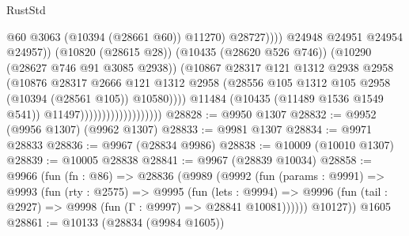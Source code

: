 \begin{lexlean}{RustStd}
\begin{coremodule}
                                                          @60
                                                          @3063
                                                          (@10394 (@28661 @60))
                                                          @11270)
                                                        @28727))))
                                                @24948
                                                @24951
                                                @24954
                                                @24957))
                                            (@10820 (@28615 @28))
                                            (@10435 (@28620 @526 @746))
                                            (@10290 (@28627 @746 @91 @3085 @2938))
                                            (@10867
                                              @28317
                                              @121
                                              @1312
                                              @2938
                                              @2958
                                              (@10876
                                                @28317
                                                @2666
                                                @121
                                                @1312
                                                @2958
                                                (@28556
                                                  @105
                                                  @1312
                                                  @105
                                                  @2958
                                                  (@10394 (@28561 @105))
                                                  @10580))))
                                          @11484
                                          (@10435 (@11489 @1536 @1549 @541))
                                          @11497)))))))))))))))))))
@28828 := @9950 @1307
@28832 := @9952 (@9956 @1307) (@9962 @1307)
@28833 := @9981 @1307
@28834 := @9971 @28833
@28836 := @9967 (@28834 @9986)
@28838 := @10009 (@10010 @1307)
@28839 := @10005 @28838
@28841 := @9967 (@28839 @10034)
@28858 := @9966
    (fun (fn : @86) =>
    @28836
      (@9989
        (@9992
          (fun (params : @9991) =>
          @9993
            (fun (rty : @2575) =>
            @9995
              (fun (lets : @9994) =>
              @9996 (fun (tail : @2927) => @9998 (fun (Γ : @9997) => @28841 @10081))))))
        @10127))
    @1605
@28861 := @10133 (@28834 (@9984 @1605))

\end{coremodule}
\end{lexlean}
